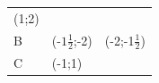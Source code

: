 {{\begin{center}
\begin{tabular}[t]{|l|l|l|}
    
        (1;2)%
     \tabularnewline\cline{1-1}\cline{2-2}\cline{3-3}
    
    
        B &
    
    
        (-$1\frac{1}{2}$;-2) &
    
    
        (-2;-1$\frac{1}{2}$)%
     \tabularnewline\cline{1-1}\cline{2-2}\cline{3-3}
    
    
        C &
    
    
        (-1;1) &
    
    
     \tabularnewline\cline{1-1}\cline{2-2}\cline{3-3}
    
    

\end{tabular}
\end{center}}}
